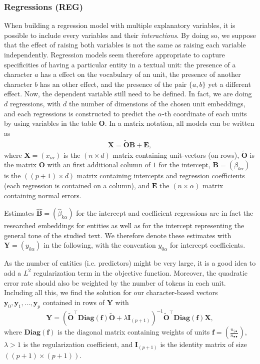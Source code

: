 \documentclass[
twocolumn,
]{ceurart}
\begin{document}
\subsubsection{Regressions (REG)}
\label{regression}

When building a regression model with multiple explanatory variables, it is possible to include every variables and their \emph{interactions}. By doing so, we suppose that the effect of raising both variables is not the same as raising each variable independently. Regression models seem therefore appropriate to capture specificities of having a particular entity in a textual unit: the presence of a character $a$ has a effect on the vocabulary of an unit, the presence of another character $b$ has an other effect, and the presence of the pair $\{a, b\}$ yet a different effect. Now, the dependent variable still need to be defined. In fact, we are doing $d$ regressions, with $d$ the number of dimensions of the chosen unit embeddings, and each regressions is constructed to predict the $\alpha$-th coordinate of each units by using variables in the table $\mathbf{O}$. In a matrix notation, all models can be written as
\begin{align}
\mathbf{X} = \widetilde{\mathbf{O}} \mathbf{B} + \mathbf{E}, \label{cent_sol}
\end{align}
where $\mathbf{X} = (x_{i\alpha})$ is the $(n \times d)$ matrix containing unit-vectors (on rows), $\widetilde{\mathbf{O}}$ is the matrix $\mathbf{O}$ with an first additional column of $1$ for the intercept, $\mathbf{B} = (\beta_{k\alpha})$ is the $((p+1) \times d)$ matrix containing intercepts and regression coefficients (each regression is contained on a column), and $\mathbf{E}$ the $(n \times \alpha)$ matrix containing normal errors. 

Estimates $\widehat{\mathbf{B}} = (\widehat{\beta}_{k\alpha})$ for the intercept and coefficient regressions are in fact the researched embeddings for entities as well as for the intercept representing the general tone of the studied text. We therefore denote these estimates with $\mathbf{Y} = (y_{k\alpha})$ in the following, with the convention $y_{0\alpha}$ for intercept coefficients. 

As the number of entities (i.e. predictors) might be very large, it is a good idea to add a $L^2$ regularization term in the objective function. Moreover, the quadratic error rate should also be weighted by the number of tokens in each unit. Including all this, we find the solution for our character-based vectors $\mathbf{y}_0, \mathbf{y}_1, \ldots, \mathbf{y}_p$ contained in rows of $\mathbf{Y}$ with 
\begin{equation}
\mathbf{Y} = (\widetilde{\mathbf{O}}^\top \textbf{Diag}(\mathbf{f}) \widetilde{\mathbf{O}} + \lambda \mathbf{I}_{(p+1)})^{-1} \widetilde{\mathbf{O}}^\top \textbf{Diag}(\mathbf{f}) \mathbf{X}, \label{reg_sol}
\end{equation}
where $\textbf{Diag}(\mathbf{f})$ is the diagonal matrix containing weights of units $\mathbf{f} = \left( \frac{n_{i \bullet}}{n_{\bullet \bullet}} \right)$, $\lambda > 1$ is the regularization coefficient, and $\mathbf{I}_{(p+1)}$ is the identity matrix of size $((p+1) \times (p+1))$.
\end{document}
